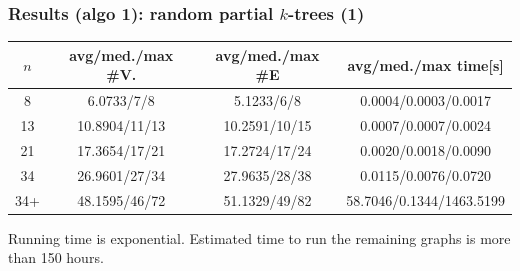\documentclass[11pt]{beamer}
\begin{document}
\begin{frame}
\frametitle{Results (algo 1): random partial $k$-trees (1)}

\begin{center}
\footnotesize
\begin{table}[h!]
\centering
\begin{tabular}{|c|c|c|c|}
\hline
$n$ & avg/med./max \#V. & avg/med./max \#E & avg/med./max time[s] \\
\hline \hline
8 & 6.0733/7/8 & 5.1233/6/8 & 0.0004/0.0003/0.0017  \\
\hline
13 & 10.8904/11/13 & 10.2591/10/15 & 0.0007/0.0007/0.0024 \\
\hline
21 & 17.3654/17/21 & 17.2724/17/24 & 0.0020/0.0018/0.0090 \\
\hline
34 & 26.9601/27/34 & 27.9635/28/38 & 0.0115/0.0076/0.0720  \\
\hline
34+ & 48.1595/46/72 & 51.1329/49/82 & 58.7046/0.1344/1463.5199  \\
\hline
\end{tabular}
\end{table}
\end{center}

Running time is exponential. Estimated time to run the remaining graphs is more than 150 hours.

\end{frame}
\end{document}

